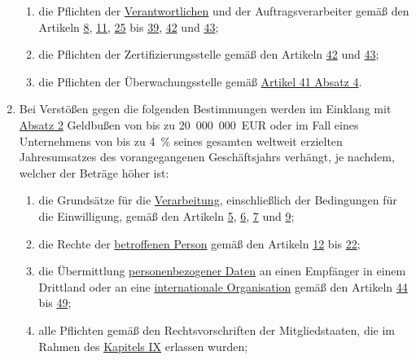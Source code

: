 \begin{enumerate}
  \begin{enumerate}
  
    \item die Pflichten der \hyperref[itm:04-7]{Verantwortlichen} und der Auftragsverarbeiter gemäß den Artikeln \hyperref[ch:8]{8},
     \hyperref[ch:11]{11}, \hyperref[ch:25]{25} bis \hyperref[ch:39]{39}, \hyperref[ch:42]{42} und \hyperref[ch:43]{43};
    \label{itm:83-4a}

    \item die Pflichten der Zertifizierungsstelle gemäß den Artikeln \hyperref[ch:42]{42} und \hyperref[ch:43]{43};
    \label{itm:83-4b}

    \item die Pflichten der Überwachungsstelle gemäß \hyperref[itm:41-4]{Artikel 41 Absatz 4}.
    \label{itm:83-4c}

  \end{enumerate}

  \item Bei Verstößen gegen die folgenden Bestimmungen werden im Einklang mit \hyperref[itm:83-2]{Absatz 2} Geldbußen
   von bis zu 20~000~000~EUR oder im Fall eines Unternehmens von bis zu 4~\% seines gesamten weltweit erzielten
   Jahresumsatzes des vorangegangenen Geschäftsjahrs verhängt, je nachdem, welcher der Beträge höher ist:
  \label{itm:83-5}

  \begin{enumerate}
  
    \item die Grundsätze für die \hyperref[itm:04-2]{Verarbeitung}, einschließlich der Bedingungen für die Einwilligung, gemäß den Artikeln
     \hyperref[ch:5]{5}, \hyperref[ch:6]{6}, \hyperref[ch:7]{7} und \hyperref[ch:9]{9};
    \label{itm:83-5a}

    \item die Rechte der \hyperref[itm:04-1]{betroffenen Person} gemäß den Artikeln \hyperref[ch:12]{12} bis \hyperref[ch:22]{22};
    \label{itm:83-5b}

    \item die Übermittlung \hyperref[itm:04-1]{personenbezogener Daten} an einen Empfänger in einem Drittland oder an eine \hyperref[itm:04-29]{internationale
     Organisation} gemäß den Artikeln \hyperref[ch:44]{44} bis \hyperref[ch:49]{49};
    \label{itm:83-5c}

    \item alle Pflichten gemäß den Rechtsvorschriften der Mitgliedstaaten, die im Rahmen des \hyperref[part:9]
     {Kapitels IX} erlassen wurden;
    \label{itm:83-5d}


\end{enumerate}
\end{enumerate}
